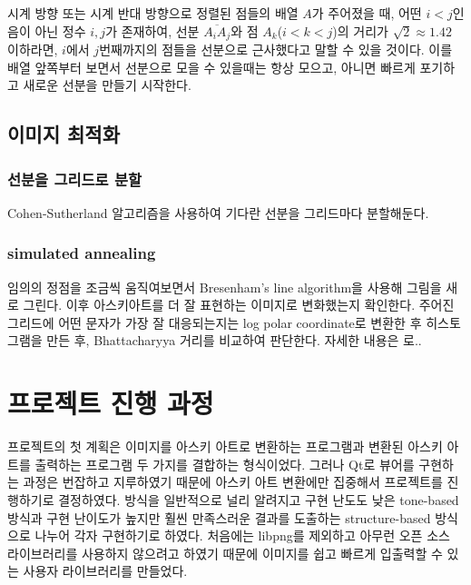 \documentclass[conference]{IEEEtran}
\begin{document}
시계 방향 또는 시계 반대 방향으로 정렬된 점들의 배열 $A$가 주어졌을 때, 어떤 $i < j$인 음이 아닌 정수 $i, j$가 존재하여,
선분 $\overline{A_iA_j}$와 점 $A_k$($i < k < j$)의 거리가 $\sqrt 2 \approx 1.42$ 이하라면, $i$에서 $j$번째까지의 점들을 선분으로 근사했다고 말할 수 있을 것이다.
이를 배열 앞쪽부터 보면서 선분으로 모을 수 있을때는 항상 모으고, 아니면 빠르게 포기하고 새로운 선분을 만들기 시작한다.
\subsection{이미지 최적화}
\subsubsection{선분을 그리드로 분할}
Cohen-Sutherland 알고리즘\cite{cohen-sutherland}을 사용하여 기다란 선분을 그리드마다 분할해둔다.

\subsubsection{simulated annealing}
임의의 정점을 조금씩 움직여보면서 Bresenham's line algorithm\cite{bresenham-line}을 사용해 그림을 새로 그린다.
이후 아스키아트를 더 잘 표현하는 이미지로 변화했는지 확인한다.
주어진 그리드에 어떤 문자가 가장 잘 대응되는지는 log polar coordinate로 변환한 후 히스토그램을 만든 후,
Bhattacharyya 거리를 비교하여 판단한다.
자세한 내용은 \cite{st-ba-ascii-art}로..


\section{프로젝트 진행 과정}

프로젝트의 첫 계획은 이미지를 아스키 아트로 변환하는 프로그램과 변환된 아스키 아트를 출력하는 프로그램 두 가지를 결합하는 형식이었다.
그러나 Qt로 뷰어를 구현하는 과정은 번잡하고 지루하였기 때문에 아스키 아트 변환에만 집중해서 프로젝트를 진행하기로 결정하였다.
방식을 일반적으로 널리 알려지고 구현 난도도 낮은 tone-based 방식과 구현 난이도가 높지만 훨씬 만족스러운 결과를 도출하는 structure-based 방식으로 나누어 각자 구현하기로 하였다.
처음에는 libpng를 제외하고 아무런 오픈 소스 라이브러리를 사용하지 않으려고 하였기 때문에 이미지를 쉽고 빠르게 입출력할 수 있는 사용자 라이브러리를 만들었다.
\end{document}
